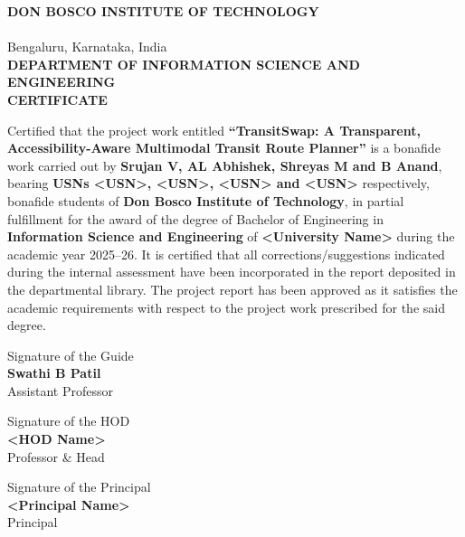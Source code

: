 \documentclass[12pt,a4paper]{report}
\begin{document}
\thispagestyle{empty}
\begin{center}
{\large \textbf{DON BOSCO INSTITUTE OF TECHNOLOGY}}\\
{}\\
{\small Bengaluru, Karnataka, India}\\[16pt]
{\large \textbf{DEPARTMENT OF INFORMATION SCIENCE AND ENGINEERING}}\\[12pt]
{\Large \textbf{CERTIFICATE}}
\end{center}
\vspace{10pt}
\noindent
Certified that the project work entitled \textbf{``TransitSwap: A Transparent, Accessibility-Aware
Multimodal Transit Route Planner''} is a bonafide work carried out by \textbf{Srujan V, AL Abhishek, Shreyas M and B Anand},
bearing \textbf{USNs <USN>, <USN>, <USN> and <USN>} respectively, bonafide students of \textbf{Don Bosco Institute of Technology}, in partial
fulfillment for the award of the degree of Bachelor of Engineering in \textbf{Information Science and Engineering} of
\textbf{<University Name>} during the academic year 2025--26. It is certified that all
corrections/suggestions indicated during the internal assessment have been incorporated in the
report deposited in the departmental library. The project report has been approved as it
satisfies the academic requirements with respect to the project work prescribed for the said
degree.

\vspace{40pt}
\noindent
\begin{minipage}{0.3\textwidth}
\centering
Signature of the Guide\\[20pt]
\textbf{Swathi B Patil}\\
Assistant Professor
\end{minipage}
\hfill
\begin{minipage}{0.3\textwidth}
\centering
Signature of the HOD\\[20pt]
\textbf{<HOD Name>}\\
Professor \& Head
\end{minipage}
\hfill
\begin{minipage}{0.3\textwidth}
\centering
Signature of the Principal\\[20pt]
\textbf{<Principal Name>}\\
Principal
\end{minipage}
\end{document}
